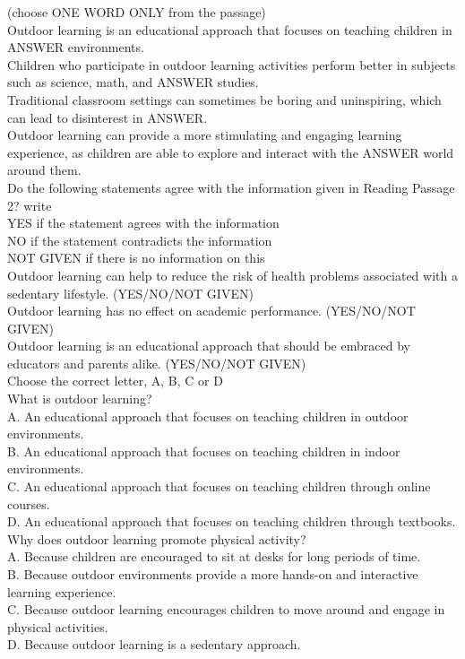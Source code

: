 \documentclass[10pt, a4paper, oneside]{article}
\begin{document}
\begin{spacing}{2.0}
(choose ONE WORD ONLY from the passage)\\


Outdoor learning is an educational approach that focuses on teaching children in ANSWER environments.\\
Children who participate in outdoor learning activities perform better in subjects such as science, math, and ANSWER studies.\\
Traditional classroom settings can sometimes be boring and uninspiring, which can lead to disinterest in ANSWER.\\
Outdoor learning can provide a more stimulating and engaging learning experience, as children are able to explore 
and interact with the ANSWER world around them.\\

Do the following statements agree with the information given in Reading Passage 2?
write\\
YES if the statement agrees with the information\\
NO if the statement contradicts the information\\
NOT GIVEN if there is no information on this\\


Outdoor learning can help to reduce the risk of health problems associated with a sedentary lifestyle. (YES/NO/NOT GIVEN)\\
Outdoor learning has no effect on academic performance. (YES/NO/NOT GIVEN)\\
Outdoor learning is an educational approach that should be embraced by educators and parents alike. (YES/NO/NOT GIVEN)\\
Choose the correct letter, A, B, C or D\\

What is outdoor learning?\\
A. An educational approach that focuses on teaching children in outdoor environments.\\
B. An educational approach that focuses on teaching children in indoor environments.\\
C. An educational approach that focuses on teaching children through online courses.\\
D. An educational approach that focuses on teaching children through textbooks.\\

Why does outdoor learning promote physical activity?\\
A. Because children are encouraged to sit at desks for long periods of time.\\
B. Because outdoor environments provide a more hands-on and interactive learning experience.\\
C. Because outdoor learning encourages children to move around and engage in physical activities.\\
D. Because outdoor learning is a sedentary approach.\\


\end{spacing}
\end{document}
